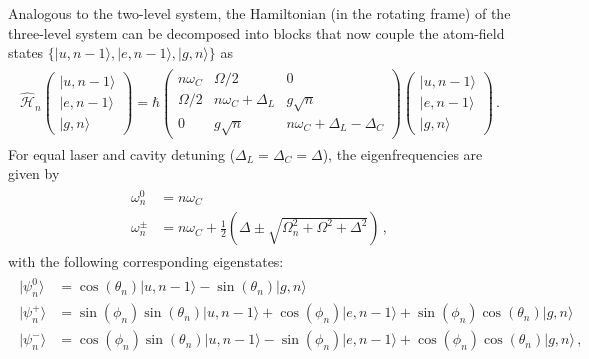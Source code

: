\documentclass[../Thesis-IJspeert.tex]{subfiles}
\begin{document}
Analogous to the two-level system, the Hamiltonian (in the rotating frame) of the three-level system can be decomposed into blocks that now couple the atom-field states $\{\vert u, n-1 \rangle,  \vert e,n-1\rangle, \vert g, n\rangle\}$ as
\begin{align}
\label{hamiltonianHn}
\begin{split}
\hat{\mathcal{H}}_n \begin{pmatrix}  \vert u, n-1 \rangle \\ \vert e, n-1\rangle \\ \vert g, n\rangle \end{pmatrix} = \hbar \begin{pmatrix} n\omega_C & \Omega/2 & 0 \\ \Omega/2 & n\omega_C + \Delta_L & g\sqrt{n} \\ 0 & g\sqrt{n} &  n\omega_C + \Delta_L-\Delta_C \end{pmatrix} \begin{pmatrix} \vert u, n-1 \rangle \\ \vert e, n-1\rangle \\ \vert g, n\rangle \end{pmatrix}\,.
\end{split}
\end{align}
For equal laser and cavity detuning ($\Delta_L=\Delta_C=\Delta$), the eigenfrequencies are given by
\begin{align}
\begin{split}
\omega_{n}^0 &= n\omega_C  \\
\omega_{n}^{\pm} &= n\omega_C + \frac{1}{2} \left(\Delta \pm \sqrt{\Omega_n^2 + \Omega^2 + \Delta^2 } \right)\,,
\label{eq:3lvlTripletEnergies}
\end{split}
\end{align}
with the following corresponding eigenstates:\iffalse \cite{kuhn10} \fi
\begin{align}
\begin{split}
\vert \psi^0_n \rangle &= \cos(\theta_n)\vert u,n-1\rangle - \sin(\theta_n)\vert{g,n}\rangle \\
\vert \psi^+_n \rangle &= \sin(\phi_n)\sin(\theta_n)\vert{u,n-1}\rangle + \cos(\phi_n)\vert{e,n-1}\rangle + \sin(\phi_n)\cos(\theta_n)\vert{g,n}\rangle \\
\vert \psi^-_n \rangle &= \cos(\phi_n)\sin(\theta_n)\vert{u,n-1}\rangle - \sin(\phi_n)\vert{e,n-1}\rangle + \cos(\phi_n)\cos(\theta_n)\vert{g,n}\rangle\,,
\label{eq:3lvlTripletStates}
\end{split}
\end{align}
\end{document}
